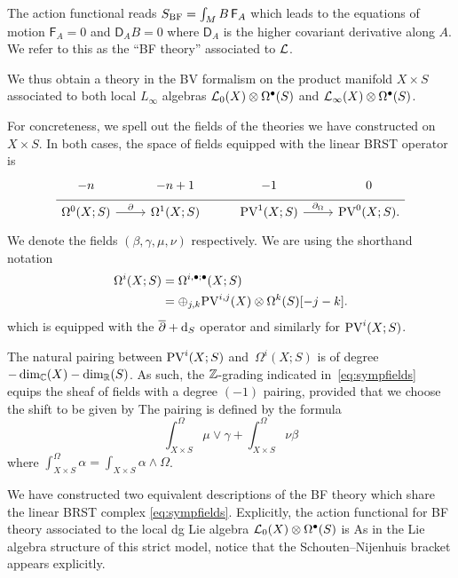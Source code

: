 The action functional reads $S_{\rm BF} = \int_M B \, \mathsf{F}_{A}$ which leads to the equations of motion $\mathsf{F}_{A} = 0$ and $\mathsf{D}_A B= 0$ where $\mathsf{D}_A$ is the higher covariant derivative along $A$. 
We refer to this as the ``BF theory'' associated to $\mathcal L$.

We thus obtain a theory in the BV formalism on the product manifold $X \times S$ associated to both local $L_\infty$ algebras $\mathcal L_0(X) \otimes \Omega^{\bullet}(S)$ and $\mathcal L_\infty(X) \otimes \Omega^\bullet(S)$.

\parsec
For concreteness, we spell out the fields of the theories we have constructed on $X \times S$.
In both cases, the space of fields equipped with the linear BRST operator is
\begin{equation}
  \label{eq:sympfields} 
  \begin{tikzcd}[row sep = 1 ex]
    -n & -n + 1 & -1 & 0 \\ \hline
    \Omega^{0}(X;S) \ar[r, "\del"] & \Omega^{1}(X;S) & 
     \PV^{1}(X; S) \ar[r, "\div"] & \PV^{0}(X; S).
\end{tikzcd}
\end{equation}
We denote the fields $(\beta,\gamma,\mu,\nu)$ respectively.
We are using the shorthand notation
\begin{align*}
\Omega^{i}(X;S) & = \Omega^{i , \bullet;\bullet}(X;S) \\
 & = \oplus_{j,k} {\rm PV}^{i,j}(X) \otimes \Omega^k(S) [-j-k] .
\end{align*}
which is equipped with the $\overline{\partial} + {\rm d}_S$ operator and similarly for ${\rm PV}^{i}(X;S)$. 

The natural pairing between ${\rm PV}^i(X;S)$ and~$\Omega^i(X;S)$ is of degree $-\dim_{\mathbb{C}}(X) -\dim_{\mathbb{R}}(S)$. 
As such, the $\mathbb{Z}$-grading indicated in~\eqref{eq:sympfields} equips the sheaf of fields with a degree $(-1)$ pairing, provided that we choose the shift to be given by
The pairing is defined by the formula 
\[
\int^\Omega_{X \times S} \mu \vee \gamma + \int^\Omega_{X \times S} \nu \beta 
\]
where $\int^\Omega_{X \times S} \alpha = \int_{X \times S} \alpha \wedge \Omega$. 

We have constructed two equivalent descriptions of the BF theory which share the linear BRST complex \eqref{eq:sympfields}.
Explicitly, the action functional for BF theory associated to the local dg Lie algebra $\mathcal L_0(X) \otimes \Omega^{\bullet}(S)$ is
As in the Lie algebra structure of this strict model, notice that the Schouten--Nijenhuis bracket appears explicitly. 

